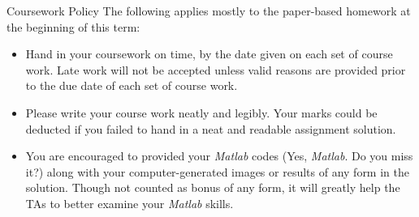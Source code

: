 \documentclass{beamer}
\begin{document}
\begin{frame}[allowframebreaks]{Coursework Policy}
The following applies mostly to the paper-based homework at the
beginning of this term:
\begin{itemize}
\item \alert{Hand in your coursework on time, by the date given on each set of course work. Late work will not be accepted unless valid reasons are provided prior to the due date of each set of course work.}
\item Please write your course work neatly and legibly. \alert{Your marks could be deducted if you failed to hand in a neat and readable assignment solution.}
\item You are \alert{encouraged} to provided your {\it Matlab} codes (Yes, {\it Matlab}. Do you miss it?) along with your computer-generated images or results of any form in the solution. Though not counted as bonus of any form, it will greatly help the TAs to better examine your {\it Matlab} skills.
\end{itemize}
\end{frame}
\end{document}
